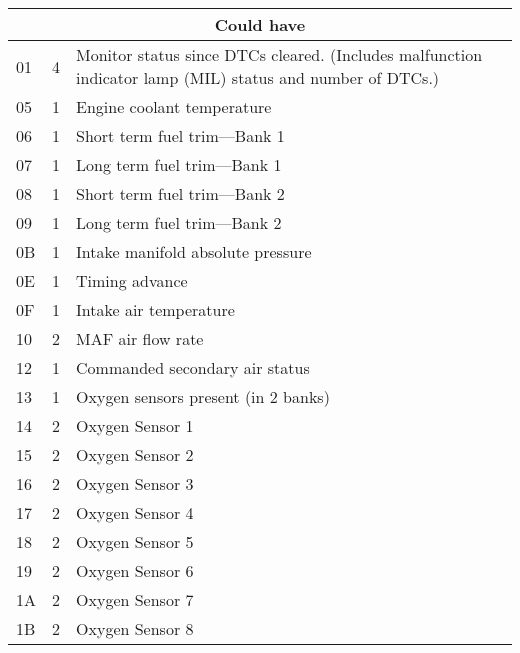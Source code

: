 \begin{longtable}{|l|c|p{10cm}|}
    \multicolumn{3}{|c|}{\textbf{Could have}}                               \\ \hline
    01 & 4  & Monitor status since DTCs cleared.
    (Includes malfunction indicator lamp (MIL) status and number of DTCs.)  \\ \hline
    05 & 1  & Engine coolant temperature                                    \\ \hline
    06 & 1  & Short term fuel trim—Bank 1                                   \\ \hline
    07 & 1  & Long term fuel trim—Bank 1                                    \\ \hline
    08 & 1  & Short term fuel trim—Bank 2                                   \\ \hline
    09 & 1  & Long term fuel trim—Bank 2                                    \\ \hline
    0B & 1  & Intake manifold absolute pressure                             \\ \hline
    0E & 1  & Timing advance                                                \\ \hline
    0F & 1  & Intake air temperature                                        \\ \hline
    10 & 2  & MAF air flow rate                                             \\ \hline
    12 & 1  & Commanded secondary air status                                \\ \hline
    13 & 1  & Oxygen sensors present (in 2 banks)                           \\ \hline
    14 & 2  & Oxygen Sensor 1                                               \\ \hline
    15 & 2  & Oxygen Sensor 2                                               \\ \hline
    16 & 2  & Oxygen Sensor 3                                               \\ \hline
    17 & 2  & Oxygen Sensor 4                                               \\ \hline
    18 & 2  & Oxygen Sensor 5                                               \\ \hline
    19 & 2  & Oxygen Sensor 6                                               \\ \hline
    1A & 2  & Oxygen Sensor 7                                               \\ \hline
    1B & 2  & Oxygen Sensor 8                                               \\ \hline

\end{longtable}
